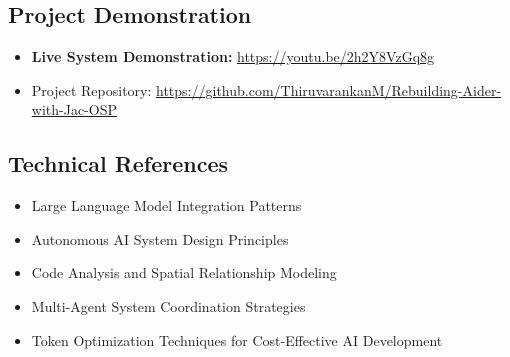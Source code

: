 \documentclass[12pt,a4paper]{article}
\begin{document}
\subsection{Project Demonstration}
\begin{itemize}
    \item \textbf{Live System Demonstration:} \url{https://youtu.be/2h2Y8VzGq8g}
    \item Project Repository: \url{https://github.com/ThiruvarankanM/Rebuilding-Aider-with-Jac-OSP}
\end{itemize}

\subsection{Technical References}
\begin{itemize}
    \item Large Language Model Integration Patterns
    \item Autonomous AI System Design Principles  
    \item Code Analysis and Spatial Relationship Modeling
    \item Multi-Agent System Coordination Strategies
    \item Token Optimization Techniques for Cost-Effective AI Development
\end{itemize}
\end{document}
